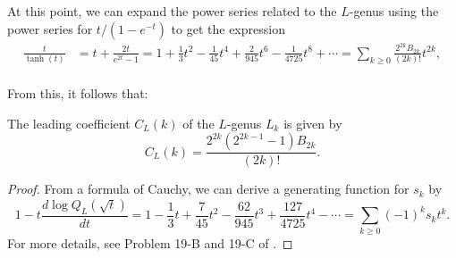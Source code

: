 At this point, we can expand the power series related to the $L$-genus using the power series for $t/(1-e^{-t})$ to get the expression
\begin{equation}\label{eq:tanh_series}
	\begin{aligned}
		\frac{t}{\tanh(t)} &= t+\frac{2t}{e^{2t}-1}= 1+\frac{1}{3}t^2-\frac{1}{45}t^4+\frac{2}{945}t^6 - \frac{1}{4725}t^8 +\cdots = \sum_{k\geq 0}\frac{2^{2k}B_{2k}}{(2k)!}t^{2k},\\
	\end{aligned}
\end{equation}

From this, it follows that:

\begin{proposition}\label{prop:leading_coefficient_L_genus}
	The leading coefficient $C_L(k)$ of the $L$-genus $L_k$ is given by
	\[
		C_L(k)=\frac{2^{2k}(2^{2k-1}-1)B_{2k}}{(2k)!}.
	\]
\end{proposition}
\begin{proof}
	From a formula of Cauchy, we can derive a generating function for $s_k$ by
	\[
		1-t\frac{d\log Q_L(\sqrt{t})}{dt} = 1-\frac{1}{3}t + \frac{7}{45}t^2-\frac{62}{945}t^3+\frac{127}{4725}t^4-\cdots = \sum_{k\geq 0} (-1)^{k}s_k t^k.
	\]
	For more details, see Problem 19-B and 19-C of \cite{milnorstasheff1974}.
\end{proof}

\smallrule
